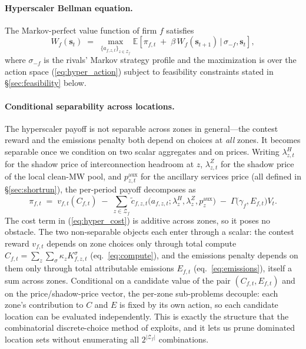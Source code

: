 \documentclass[12pt,letterpaper]{article}
\begin{document}
\paragraph{Hyperscaler Bellman equation.} The Markov-perfect value function
of firm $f$ satisfies
\begin{equation}
\label{eq:hyper_bellman}
W_f(\mathbf{s}_t) \;=\; \max_{\{a_{f,z,t}\}_{z \in \mathcal{Z}_f}} \mathbb{E}\left[
\pi_{f,t} \;+\; \beta\, W_f(\mathbf{s}_{t+1})
\,\Big|\, \sigma_{-f}, \mathbf{s}_t \right],
\end{equation}
where $\sigma_{-f}$ is the rivals' Markov strategy profile and the maximization
is over the action space (\ref{eq:hyper_action}) subject to feasibility
constraints stated in \S\ref{sec:feasibility} below.

\paragraph{Conditional separability across locations.} The hyperscaler payoff
is not separable across zones in general---the contest reward and the emissions
penalty both depend on choices at \emph{all} zones. It becomes separable once
we condition on two scalar aggregates and on prices. Writing $\lambda^H_{z,t}$
for the shadow price of interconnection headroom at $z$, $\lambda^Z_{z,t}$ for
the shadow price of the local clean-MW pool, and $p^{\text{aux}}_{z,t}$ for the
ancillary services price (all defined in \S\ref{sec:shortrun}), the per-period
payoff decomposes as
\begin{equation}
\label{eq:separability}
\pi_{f,t} \;=\; v_{f,t}(C_{f,t}) \;-\;
\sum_{z \in \mathcal{Z}_f} \tilde c_{f,z,t}\big(a_{f,z,t}; \lambda^H_z, \lambda^Z_z, p^{\text{aux}}_z\big)
\;-\; \Gamma\big(\gamma_f, E_{f,t}\big) V_t .
\end{equation}
The cost term in (\ref{eq:hyper_cost}) is additive across zones, so it poses no
obstacle. The two non-separable objects each enter through a scalar: the
contest reward $v_{f,t}$ depends on zone choices only through total compute
$C_{f,t} = \sum_{z}\sum_\sigma \kappa_z K_{f,z,t}^\sigma$
(eq.~\ref{eq:compute}), and the emissions penalty depends on them only through
total attributable emissions $E_{f,t}$ (eq.~\ref{eq:emissions}), itself a sum
across zones. Conditional on a candidate value of the pair
$(C_{f,t}, E_{f,t})$ and on the price/shadow-price vector, the per-zone
sub-problems decouple: each zone's contribution to $C$ and $E$ is fixed by its
own action, so each candidate location can be evaluated independently. This is
exactly the structure that the combinatorial discrete-choice method of
\citet{arkolakis2023combinatorial} exploits, and it lets us prune dominated
location sets without enumerating all $2^{|\mathcal{Z}_f|}$ combinations.
\end{document}
